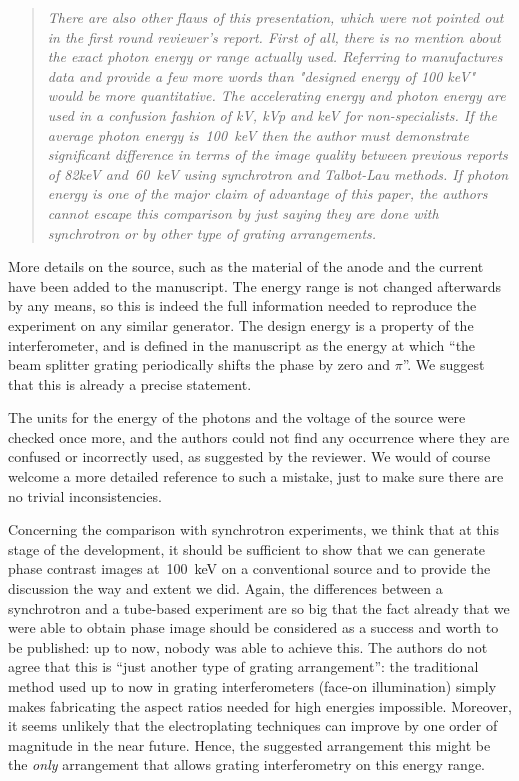 \documentclass[a4paper,english]{scrartcl}
\newenvironment{reviewerquote}{\begin{quote}\itshape}{\end{quote}}
\begin{document}
\begin{reviewerquote}
There are also other flaws of this presentation, which were not
pointed out in the first round reviewer's report. First of all, there is no
mention about the exact photon energy or range actually used. Referring to
manufactures data and provide a few more words than "designed energy of 100
keV" would be more quantitative. The accelerating energy and photon energy
are used in a confusion fashion of kV, kVp and keV for non-specialists. If
the average photon energy is~\SI{100}{\kilo\eV} then the author must demonstrate
significant difference in terms of the image quality between previous
reports of 82keV and~\SI{60}{\kilo\eV} using synchrotron and Talbot-Lau methods. If
photon energy is one of the major claim of advantage of this paper, the
authors cannot escape this comparison by just saying they are done with
synchrotron or by other type of grating arrangements.
\end{reviewerquote}

More details on the source, such as the material of the anode and the
current have been added to the manuscript. The energy range is not changed
afterwards by any means, so this is indeed the full
information needed to reproduce the experiment on any similar generator.
The design energy is a property of the interferometer, and is defined in the
manuscript as the energy at which ``the beam splitter grating periodically
shifts the phase by zero and $\pi$''. We suggest that this is already a
precise statement.

The units for the energy of the
photons and the voltage of the source were checked once more, and the authors could not find any
occurrence where they are confused or incorrectly used, as suggested by the
reviewer. We would of course welcome a more detailed reference to such a mistake, just
to make sure there are no trivial inconsistencies.

Concerning the comparison with synchrotron experiments, we think
that at this stage of the development, it should be sufficient to show that
we can generate phase contrast images at~\SI{100}{\kilo\eV} on a conventional source
and to provide the discussion the way and extent we did. Again, the differences
between a synchrotron and a tube-based experiment are so big that the fact
already that we were able to obtain phase image should be considered as a
success and worth to be
published: up to now, nobody was able to achieve this.
The authors do not agree that this is ``just another type of grating
arrangement'': the traditional method used up to now in grating
interferometers (face-on illumination) simply makes fabricating the aspect
ratios needed for high energies impossible. Moreover, it seems unlikely that
the electroplating techniques can improve by one order of magnitude in the
near future.
Hence, the suggested arrangement this might be the \emph{only} arrangement
that allows grating interferometry on this energy range.
\end{document}
